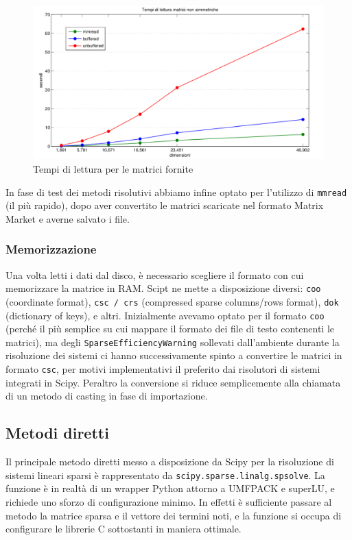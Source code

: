 \documentclass[11pt,a4paper]{scrartcl}
\begin{document}
\begin{figure}[!ht]
\centering
\includegraphics[scale=0.51]{images/lettura} 
\caption{Tempi di lettura per le matrici fornite}
\label{lettura}
\end{figure}

In fase di test dei metodi risolutivi abbiamo infine optato per l'utilizzo di \texttt{mmread} (il più rapido), dopo aver convertito le matrici scaricate nel formato Matrix Market e averne salvato i file.

\subsubsection*{Memorizzazione}

Una volta letti i dati dal disco, è necessario scegliere il formato con cui memorizzare la matrice in RAM. Scipt ne mette a disposizione diversi: \texttt{coo} (coordinate format), \texttt{csc / crs} (compressed sparse columns/rows format), \texttt{dok} (dictionary of keys), e altri. Inizialmente avevamo optato per il formato \texttt{coo} (perché il più semplice su cui mappare il formato dei file di testo contenenti le matrici), ma degli \texttt{SparseEfficiencyWarning} sollevati dall'ambiente durante la risoluzione dei sistemi ci hanno successivamente spinto a convertire le matrici in formato \texttt{csc}, per motivi implementativi il preferito dai risolutori di sistemi integrati in Scipy. Peraltro la conversione si riduce semplicemente alla chiamata di un metodo di casting in fase di importazione.

\subsection*{Metodi diretti}
Il principale metodo diretti messo a disposizione da Scipy per la risoluzione di sistemi lineari sparsi è rappresentato da \texttt{scipy.sparse.linalg.spsolve}. La funzione è in realtà di un wrapper Python attorno a UMFPACK e superLU, e richiede uno sforzo di configurazione minimo. In effetti è sufficiente passare al metodo la matrice sparsa e il vettore dei termini noti, e la funzione si occupa di configurare le librerie C sottostanti in maniera ottimale.
\end{document}
